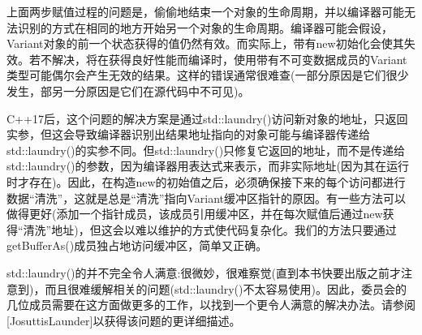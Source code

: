 上面两步赋值过程的问题是，偷偷地结束一个对象的生命周期，并以编译器可能无法识别的方式在相同的地方开始另一个对象的生命周期。编译器可能会假设，Variant对象的前一个状态获得的值仍然有效。而实际上，带有new初始化会使其失效。若不解决，将在获得良好性能而编译时，使用带有不可变数据成员的Variant类型可能偶尔会产生无效的结果。这样的错误通常很难查(一部分原因是它们很少发生，部另一分原因是它们在源代码中不可见)。

C++17后，这个问题的解决方案是通过std::laundry()访问新对象的地址，只返回实参，但这会导致编译器识别出结果地址指向的对象可能与编译器传递给std::laundry()的实参不同。但std::laundry()只修复它返回的地址，而不是传递给std::laundry()的参数，因为编译器用表达式来表示，而非实际地址(因为其在运行时才存在)。因此，在构造new的初始值之后，必须确保接下来的每个访问都进行数据“清洗”，这就是总是“清洗”指向Variant缓冲区指针的原因。有一些方法可以做得更好(添加一个指针成员，该成员引用缓冲区，并在每次赋值后通过new获得“清洗”地址)，但这会以难以维护的方式使代码复杂化。我们的方法只要通过getBufferAs()成员独占地访问缓冲区，简单又正确。

std::laundry()的并不完全令人满意:很微妙，很难察觉(直到本书快要出版之前才注意到)，而且很难缓解相关的问题(std::laundry()不太容易使用)。因此，委员会的几位成员需要在这方面做更多的工作，以找到一个更令人满意的解决办法。请参阅[JosuttisLaunder]以获得该问题的更详细描述。


